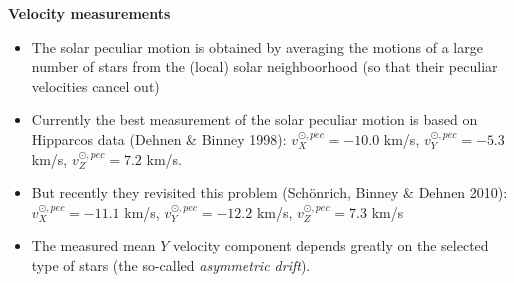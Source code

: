 \documentclass[letterpaper,landscape]{slides}
\begin{document}
\begin{slide}

\begin{center}
\bfseries
\large {} Velocity measurements 
\end{center}
\vskip 0.2in
\begin{itemize}
\item The solar peculiar motion is obtained by averaging the motions of
   a large number of stars from the (local) solar neighboorhood (so that
   their peculiar velocities cancel out)
\item Currently the best measurement of the solar peculiar motion is
   based on Hipparcos data (Dehnen \& Binney 1998): 
  {\color{blue}  $v_X^{\odot,pec}=-10.0$ km/s,  $v_Y^{\odot,pec}=-5.3$ km/s,  
   $v_Z^{\odot,pec}=7.2$ km/s.}
\item But recently they revisited this problem (Sch\"{o}nrich, Binney \& Dehnen 2010): \\
  {\color{blue}  $v_X^{\odot,pec}=-11.1$ km/s,  $v_Y^{\odot,pec}=-12.2$ km/s,  
   $v_Z^{\odot,pec}=7.3$ km/s}
\item The measured mean $Y$ velocity component depends greatly on 
   the selected type of stars (the so-called {\it asymmetric drift}).   
\end{itemize}

\vfill
\end{slide}




\end{document}
